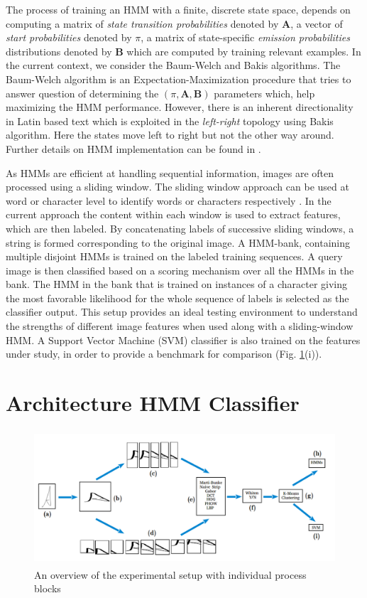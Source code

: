 \documentclass[runningheads]{llncs}
\def\A{{\mathbf A}}
\def\B{{\mathbf B}}
\begin{document}
The process of training an HMM with a finite, discrete state space, depends on computing a matrix of \emph{state transition probabilities} denoted by $\A$, a vector of \emph{start probabilities} denoted by $\pi$, a matrix of state-specific \emph{emission probabilities} distributions denoted by $\B$ which are computed by training relevant examples. In the current context, we consider the Baum-Welch and Bakis algorithms. The Baum-Welch algorithm is an Expectation-Maximization procedure that tries to answer question of determining the $(\pi, \A, \B)$ parameters which, help maximizing the HMM performance. However, there is an inherent directionality in Latin based text which is exploited in the \emph{left-right} topology using Bakis algorithm. Here the states move left to right but not the other way around. Further details on HMM implementation can be found in \cite{Rabi89}.

As HMMs are efficient at handling sequential information, images are often processed using a sliding window. The sliding window approach can be used at word or character level to identify words or characters respectively \cite{Fink09}. In the current approach the content within each window is used to extract features, which are then labeled. By concatenating labels of successive sliding windows, a string is formed corresponding to the original image. A HMM-bank, containing multiple disjoint HMMs is trained on the labeled training sequences. A query image is then classified based on a scoring mechanism over all the HMMs in the bank. The HMM in the bank that is trained on instances of a character giving the most favorable likelihood for the whole sequence of labels is selected as the classifier output. This setup provides an ideal testing environment to understand the strengths of different image features when used along with a sliding-window HMM. A Support Vector Machine (SVM) classifier is also trained on the features under study, in order to provide a benchmark for comparison (Fig. {\ref{fig:architecture}}(i)).

\section{Architecture HMM Classifier}
\label{sec:HMM}
\begin{figure}[t]

\begin{minipage}[b]{1.0\linewidth}
  \centering
  \centerline{\includegraphics[width=13.0cm,height=5.0cm]{architecture}}
\end{minipage}
\caption{An overview of the experimental setup with individual process blocks}
\label{fig:architecture}
%
\end{figure}
\end{document}
